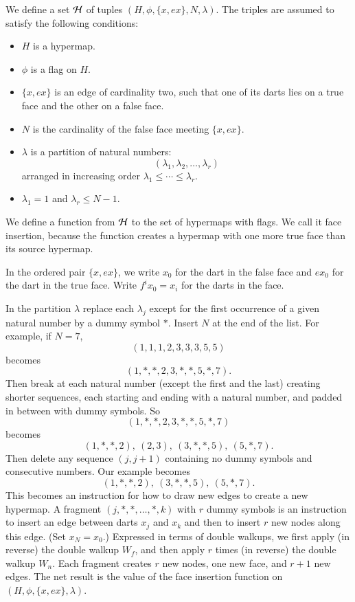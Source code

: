 We define a set ${\cal H}$ of tuples $(H,\phi,\{x,e x\},N,\lambda)$.
The triples are assumed to satisfy the following conditions:
\begin{itemize}
    \item $H$ is a hypermap.
    \item $\phi$ is a flag on $H$.
    \item $\{x,e x\}$ is an edge of cardinality two, such that one
    of its darts lies on a true face and the other on a false face.
    \item $N$ is the cardinality of the false face meeting $\{x,e
    x\}$.
    \item $\lambda$ is a partition of natural numbers:
        $$
        (\lambda_1,\lambda_2,\ldots,\lambda_r)
        $$
    arranged in increasing order $\lambda_1\le \cdots \le
    \lambda_r$.
    \item $\lambda_1 = 1$ and $\lambda_r \le N-1$.
\end{itemize}

We define a function from $\cal H$ to the set of hypermaps with
flags.  We call it face insertion, because the function creates a
hypermap with one more true face than its source hypermap.

In the ordered pair $\{x,e x\}$, we write $x_0$ for the dart in the
false face and $e x_0$ for the dart in the true face.  Write $f^i
x_0 = x_i$ for the darts in the face.

In the partition $\lambda$ replace each $\lambda_j$ except for the
first occurrence of a given natural number by a dummy symbol $*$.
Insert $N$ at the end of the list. For example, if $N=7$,
    $$(1,1,1,2,3,3,3,5,5)$$ becomes
    $$(1,*,*,2,3,*,*,5,*,7).$$
Then break at each natural number (except the first and the last)
creating shorter sequences, each starting and ending with a natural
number, and padded in between with dummy symbols. So
    $$(1,*,*,2,3,*,*,5,*,7)$$ becomes
$$(1,*,*,2),\ (2,3),\ (3,*,*,5),\ (5,*,7).$$
Then delete any sequence $(j,j+1)$ containing no dummy symbols and
consecutive numbers. Our example becomes
  $$
  (1,*,*,2),\  (3,*,*,5),\ (5,*,7).
  $$
This becomes an instruction for how to draw new edges to create a
new hypermap. A fragment $(j,*,*,\ldots,*,k)$ with $r$ dummy symbols
is an instruction to insert an edge between darts $x_j$ and $x_k$
and then to insert $r$ new nodes along this edge.  (Set $x_N =
x_0$.) Expressed in terms of double walkups, we first apply (in
reverse) the double walkup $W_f$, and then apply $r$ times (in
reverse) the double walkup $W_n$.  Each fragment creates $r$ new
nodes, one new face, and $r+1$ new edges.  The net result is the
value of the face insertion function on $(H,\phi,\{x,e
x\},\lambda)$.

